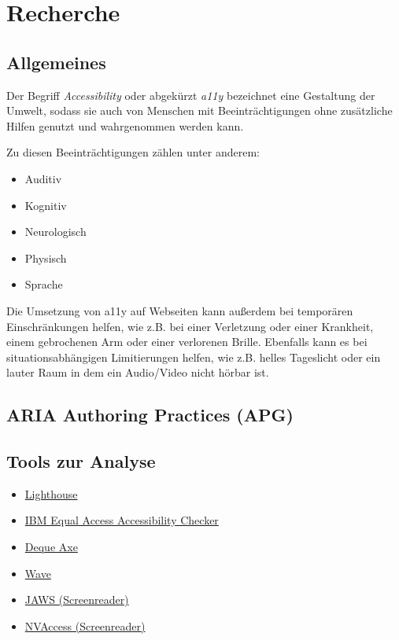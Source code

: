 \chapter{Recherche}

\label{Chapter3}

\section{Allgemeines}

Der Begriff \emph{Accessibility} oder abgekürzt \emph{a11y} bezeichnet eine Gestaltung der Umwelt, sodass sie auch von Menschen mit Beeinträchtigungen ohne zusätzliche Hilfen genutzt und wahrgenommen werden kann. \cite{Bundesfachstelle_Barrierefreiheit_a11y_Definition} 

Zu diesen Beeinträchtigungen zählen unter anderem:

\begin{itemize}
    \item Auditiv
    \item Kognitiv
    \item Neurologisch
    \item Physisch
    \item Sprache
\end{itemize}

Die Umsetzung von a11y auf Webseiten kann außerdem bei temporären Einschränkungen helfen, wie z.B. bei einer Verletzung oder einer Krankheit, einem gebrochenen Arm oder einer verlorenen Brille. Ebenfalls kann es bei situationsabhängigen Limitierungen helfen, wie z.B. helles Tageslicht oder ein lauter Raum in dem ein Audio/Video nicht hörbar ist.

\section{ARIA Authoring Practices (APG)}

\section{Tools zur Analyse}

\begin{itemize}
    \item \href{https://developers.google.com/web/tools/lighthouse/#devtools}{Lighthouse}
    \item \href{https://chrome.google.com/webstore/detail/ibm-equal-access-accessib/lkcagbfjnkomcinoddgooolagloogehp?hl=en-US}{IBM Equal Access Accessibility Checker}
    \item \href{https://www.deque.com/axe/}{Deque Axe}
    \item \href{https://wave.webaim.org/extension/}{Wave}
    \item \href{https://support.freedomscientific.com/Downloads/JAWS}{JAWS (Screenreader)}
    \item \href{https://www.nvaccess.org/download/}{NVAccess (Screenreader)}
\end{itemize}

